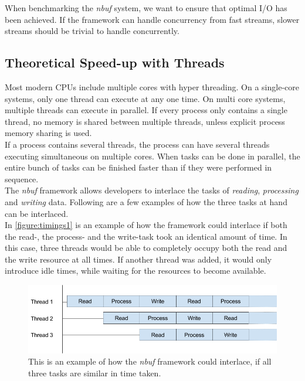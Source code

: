 \documentclass[a4paper]{article}
\newcommand{\nbuf}{\textit{nbuf} }
\begin{document}
When benchmarking the \nbuf system, we want to ensure that optimal I/O has been achieved. If the framework can handle concurrency from fast streams, slower streams should be trivial to handle concurrently.


\subsection{Theoretical Speed-up with Threads}
Most modern CPUs include multiple cores with hyper threading. On a single-core systems, only one thread can execute at any one time. On multi core systems, multiple threads can execute in parallel. If every process only contains a single thread, no memory is shared between multiple threads, unless explicit process memory sharing is used.\\

If a process contains several threads, the process can have several threads executing simultaneous on multiple cores. When tasks can be done in parallel, the entire bunch of tasks can be finished faster than if they were performed in sequence.\\

The \nbuf framework allows developers to interlace the tasks of \textit{reading}, \textit{processing} and \textit{writing} data. Following are a few examples of how the three tasks at hand can be interlaced.\\

In \autoref{figure:timings1} is an example of how the framework could interlace if both the read-, the process- and the write-task took an identical amount of time. In this case, three threads would be able to completely occupy both the read and the write resource at all times. If another thread was added, it would only introduce idle times, while waiting for the resources to become available.\\

\begin{figure}
	\begin{adjustwidth}{-0.5in}{-0.5in}
    \centering
     \includegraphics[scale=0.5]{figures/timings1.png}
  	\caption{This is an example of how the \nbuf framework could interlace, if all three tasks are similar in time taken.}
	\label{figure:timings1}
	\end{adjustwidth}
\end{figure}
\end{document}
